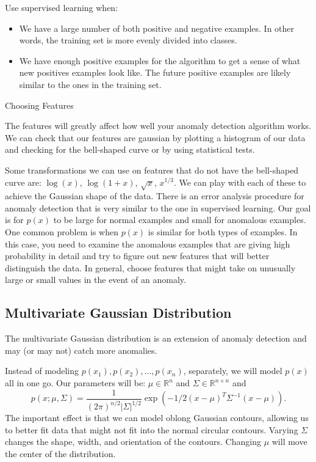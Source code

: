 \documentclass[a4paper,11pt]{report}
\begin{document}
Use supervised learning when:
\begin{itemize}
\item We have a large number of both positive and negative examples. In other words, the training set is more evenly divided into classes.
\item We have enough positive examples for the algorithm to get a sense of what new positives examples look like. The future positive examples are likely similar to the ones in the training set.
\end{itemize}
Choosing Features

The features will greatly affect how well your anomaly detection algorithm works. We can check that our features are gaussian by plotting a histogram of our data and checking for the bell-shaped curve or by using statistical tests.

Some transformations we can use on features that do not have the bell-shaped curve are: $\log(x)$, $\log(1+x)$, $\sqrt{x}$, $x^{1/3}$. We can play with each of these to achieve the Gaussian shape of the data.
There is an error analysis procedure for anomaly detection that is very similar to the one in supervised learning. Our goal is for $p(x)$ to be large for normal examples and small for anomalous examples.
One common problem is when $p(x)$ is similar for both types of examples. In this case, you need to examine the anomalous examples that are giving high probability in detail and try to figure out new features that will better distinguish the data. In general, choose features that might take on unusually large or small values in the event of an anomaly.


\subsection*{Multivariate Gaussian Distribution}

The multivariate Gaussian distribution is an extension of anomaly detection and may (or may not) catch more anomalies.

Instead of modeling $p(x_1),p(x_2),\ldots, p(x_n)$, separately, we will model $p(x)$ all in one go. Our parameters will be: $\mu \in \mathbb{R}^n$ and $\Sigma\in \mathbb{R}^{n\times n}$ and
$$p(x;\mu,\Sigma) = \dfrac{1}{(2\pi)^{n/2} |\Sigma|^{1/2}} \exp(-1/2(x-\mu)^T\Sigma^{-1}(x-\mu)).$$
The important effect is that we can model oblong Gaussian contours, allowing us to better fit data that might not fit into the normal circular contours.
Varying $\Sigma$ changes the shape, width, and orientation of the contours. Changing $\mu$ will move the center of the distribution.
\end{document}
